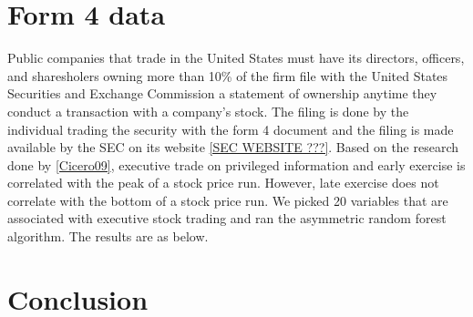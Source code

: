 \section{Form 4 data}
Public companies that trade in the United States must have its directors, officers, and sharesholers owning more than 10\% of the firm file with the United States Securities and Exchange Commission a statement of ownership anytime they conduct a transaction with a company's stock. The filing is done by the individual trading the security with the form 4 document and the filing is made available by the SEC on its website \ref{SEC WEBSITE ???}. Based on the research done by \ref{Cicero09}, executive trade on privileged information and early exercise is correlated with the peak of a stock price run. However, late exercise does not correlate with the bottom of a stock price run. We picked 20 variables that are associated with executive stock trading and ran the asymmetric random forest algorithm. The results are as below.  


\conclusion



\section{Conclusion}








